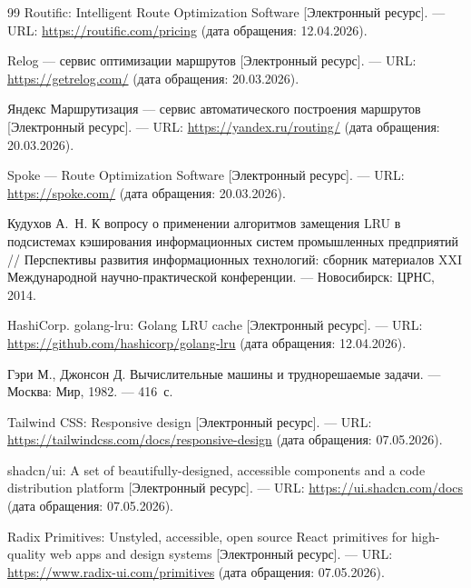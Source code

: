 \begin{thebibliography}{99}
      Routific: Intelligent Route Optimization Software [Электронный ресурс]. ---
      URL: \url{https://routific.com/pricing} (дата обращения: 12.04.2026).

      

      Relog --- сервис оптимизации маршрутов [Электронный ресурс]. ---
      URL: \url{https://getrelog.com/} (дата обращения: 20.03.2026).

      

      Яндекс Маршрутизация --- сервис автоматического построения маршрутов
      [Электронный ресурс]. ---
      URL: \url{https://yandex.ru/routing/} (дата обращения: 20.03.2026).

      

      Spoke --- Route Optimization Software [Электронный ресурс]. ---
      URL: \url{https://spoke.com/} (дата обращения: 20.03.2026).

      

      Кудухов А.~Н.
      К вопросу о применении алгоритмов замещения LRU в подсистемах
      кэширования информационных систем промышленных предприятий //
      Перспективы развития информационных технологий: сборник материалов
      XXI Международной научно-практической конференции. ---
      Новосибирск: ЦРНС, 2014.

      

      HashiCorp.
      golang-lru: Golang LRU cache [Электронный ресурс]. ---
      URL: \url{https://github.com/hashicorp/golang-lru} (дата обращения: 12.04.2026).

      

      Гэри М., Джонсон Д.
      Вычислительные машины и труднорешаемые задачи. ---
      Москва: Мир, 1982. --- 416~с.

      

      Tailwind CSS: Responsive design [Электронный ресурс]. ---
      URL: \url{https://tailwindcss.com/docs/responsive-design} (дата обращения: 07.05.2026).

      

      shadcn/ui: A set of beautifully-designed, accessible components
      and a code distribution platform [Электронный ресурс]. ---
      URL: \url{https://ui.shadcn.com/docs} (дата обращения: 07.05.2026).

      

      Radix Primitives: Unstyled, accessible, open source React primitives
      for high-quality web apps and design systems [Электронный ресурс]. ---
      URL: \url{https://www.radix-ui.com/primitives} (дата обращения: 07.05.2026).


\end{thebibliography}
